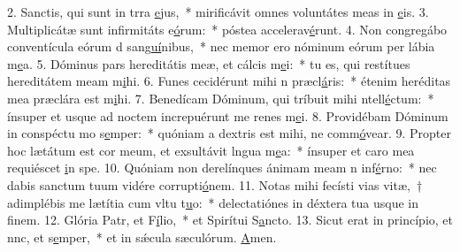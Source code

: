 2. Sanctis, qui sunt in trra \uline{e}jus,~* mirificávit omnes voluntátes meas in \uline{e}is.
3. Multiplicátæ sunt infirmitáts e\uline{ó}rum:~* póstea accelerav\uline{é}runt.
4. Non congregábo conventícula eórum d san\uline{guí}nibus,~* nec memor ero nóminum eórum per lábia m\uline{e}a.
5. Dóminus pars hereditátis meæ, et cálcis m\uline{e}i:~* tu es, qui restítues hereditátem meam m\uline{i}hi.
6. Funes cecidérunt mihi n præcl\uline{á}ris:~* étenim heréditas mea præclára est m\uline{i}hi.
7. Benedícam Dóminum, qui tríbuit mihi ntell\uline{é}ctum:~* ínsuper et usque ad noctem increpuérunt me renes m\uline{e}i.
8. Providébam Dóminum in conspéctu mo s\uline{e}mper:~* quóniam a dextris est mihi, ne comm\uline{ó}vear.
9. Propter hoc lætátum est cor meum, et exsultávit lngua m\uline{e}a:~* ínsuper et caro mea requiéscet \uline{i}n spe.
10. Quóniam non derelínques ánimam meam n inf\uline{é}rno:~* nec dabis sanctum tuum vidére corrupti\uline{ó}nem.
11. Notas mihi fecísti vias vitæ,~† adimplébis me lætítia cum vltu t\uline{u}o:~* delectatiónes in déxtera tua usque in f\uline{i}nem.
12. Glória Patr, et F\uline{í}lio,~* et Spirítui S\uline{a}ncto.
13. Sicut erat in princípio, et nnc, et s\uline{e}mper,~* et in sǽcula sæculórum. \uline{A}men.
